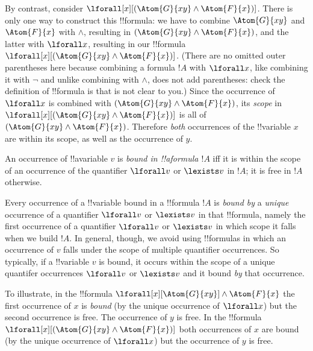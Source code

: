 \documentclass[../../../../include/open-logic-section]{subfiles}
\begin{document}
By contrast, consider $\lforall[x][(\Atom{G}{xy}\land\Atom{F}{x})]$.
There is only one way to construct this !!{formula}: we have to
combine $\Atom{G}{xy}$ and $\Atom{F}{x}$ with $\land$, resulting in
$(\Atom{G}{xy}\land\Atom{F}{x})$, and the latter with $\lforall x$,
resulting in our !!{formula}
$\lforall[x][(\Atom{G}{xy}\land\Atom{F}{x})]$. (There are no omitted
outer parentheses here because combining a formula $!A$ with $\lforall
x$, like combining it with $\lnot$ and unlike combining with $\land$,
does not add parentheses: check the definition of !!{formula} is that
is not clear to you.) Since the occurrence of $\lforall x$ is 
combined with $(\Atom{G}{xy}\land\Atom{F}{x})$, its \emph{scope}
in $\lforall[x][(\Atom{G}{xy}\land\Atom{F}{x})]$ is all of 
$(\Atom{G}{xy}\land\Atom{F}{x})$. Therefore \emph{both} occurrences of
the !!{variable} $x$ are within its scope, as well as the occurrence 
of $y$.

\begin{defn}
An occurrence of !!a{variable} $v$ is \emph{bound in !!a{formula} $!A$}
 iff it is within the scope of an occurrence of the
 quantifier $\lforall v$ or $\lexists v$ in $!A$; it is free in $!A$ otherwise.

Every occurrence of a !!{variable} bound in a !!{formula} $!A$ is
\emph{bound by} a \emph{unique} occurrence of a quantifier $\lforall
v$ or $\lexists v$ in that !!{formula}, namely the first occurrence of
a quantifier $\lforall v$ or $\lexists v$ in which scope it falls when
we build $!A$. In general, though, we avoid using !!{formula}s in
which an occurrence of $v$ falls under the scope of multiple
quantifier occurrences. So typically, if a !!{variable} $v$ is bound,
it occurs within the scope of a unique quantifer occurrences $\lforall
v$ or $\lexists v$ and it bound \emph{by} that occurrence.
\end{defn}

To illustrate, in the !!{formula}
 $\lforall[x][\Atom{G}{xy}]\land\Atom{F}{x}$ the first occurrence of
 $x$ is \emph{bound} (by the unique occurrence of $\lforall x$) but
 the second occurrence is free. The occurrence of $y$ is free. In the
 !!{formula} $\lforall[x][(\Atom{G}{xy}\land\Atom{F}{x})]$ both
 occurrences of $x$ are bound (by the unique occurrence of $\lforall
 x$)  but the occurrence of $y$ is free. 
\end{document}
